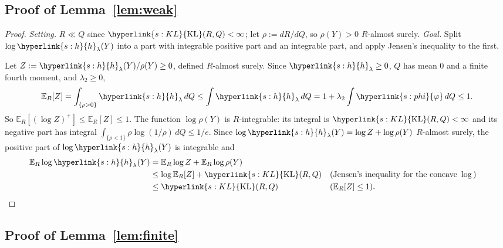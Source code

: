 \documentclass[11pt]{article}
\newcommand{\E}{\mathbb{E}}
\newcommand{\sy}[2]{{\hyperlink{#1}{#2}}}
\newcommand{\KL}{\sy{s:KL}{\mathrm{KL}}}
\newcommand{\phik}{\sy{s:phi}{\varphi}}
\newcommand{\hl}{\sy{s:h}{h}}
\begin{document}
\subsection{Proof of Lemma~\ref{lem:weak}}\label{sec:proof-lem-weak}

\begin{proof}
\emph{Setting.} $R\ll Q$ since $\KL(R,Q)<\infty$; let $\rho:=dR/dQ$, so $\rho(Y)>0$ $R$-almost surely. \emph{Goal.} Split
$\log\hl_\lambda(Y)$ into a part with integrable positive part and an integrable part, and apply Jensen's inequality
to the first.

Let $Z:=\hl_\lambda(Y)/\rho(Y)\ge0$, defined $R$-almost surely. Since $\hl_\lambda\ge0$, $Q$ has mean $0$ and a finite fourth
moment, and $\lambda_2\ge0$,
\begin{equation*}
  \E_R[Z]=\int_{\{\rho>0\}}\hl_\lambda\,dQ\le\int\hl_\lambda\,dQ=1+\lambda_2\int\phik\,dQ\le1 .
\end{equation*}
So $\E_R[(\log Z)^+]\le\E_R[Z]\le1$. The function $\log\rho(Y)$ is $R$-integrable: its integral is $\KL(R,Q)<\infty$
and its negative part has integral $\int_{\{\rho<1\}}\rho\log(1/\rho)\,dQ\le1/e$. Since
$\log\hl_\lambda(Y)=\log Z+\log\rho(Y)$ $R$-almost surely, the positive part of $\log\hl_\lambda(Y)$ is integrable and
\begin{align*}
  \E_R\log\hl_\lambda(Y)&=\E_R\log Z+\E_R\log\rho(Y)\\
  &\le\log\E_R[Z]+\KL(R,Q) && \text{(Jensen's inequality for the concave }\log\text{)}\\
  &\le\KL(R,Q) && (\E_R[Z]\le1).
\end{align*}
\end{proof}

\subsection{Proof of Lemma~\ref{lem:finite}}\label{sec:proof-lem-finite}
\end{document}
